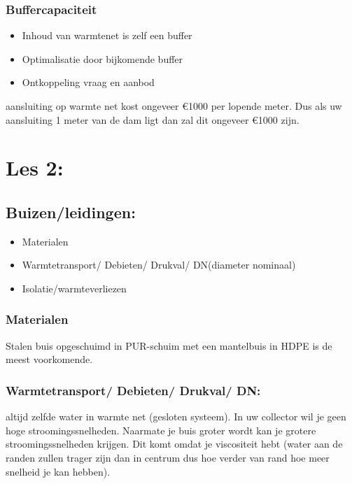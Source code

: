 \documentclass[12pt]{article}
\begin{document}
\subsubsection{Buffercapaciteit}
\begin{itemize}
    \item Inhoud van warmtenet is zelf een buffer 
    \item Optimalisatie door bijkomende buffer 
    \item Ontkoppeling vraag en aanbod
\end{itemize}
aansluiting op warmte net kost ongeveer €1000 per lopende meter. Dus als uw aansluiting 1 meter van de dam ligt dan zal dit ongeveer €1000 zijn.
\section{Les 2:}
\subsection{Buizen/leidingen:}
\begin{itemize}
    \item Materialen 
    \item Warmtetransport/ Debieten/ Drukval/ DN(diameter nominaal)
    \item Isolatie/warmteverliezen
\end{itemize}
\subsubsection{Materialen}
Stalen buis opgeschuimd in PUR-schuim met een mantelbuis in HDPE is de meest voorkomende.
\subsubsection{Warmtetransport/ Debieten/ Drukval/ DN:}
altijd zelfde water in warmte net (gesloten systeem). In uw collector wil je geen hoge stroomingssnelheden. Naarmate je buis groter wordt kan je grotere stroomingssnelheden krijgen. Dit komt omdat je viscositeit hebt (water aan de randen zullen trager zijn dan in centrum dus hoe verder van rand hoe meer snelheid je kan hebben).
\end{document}
